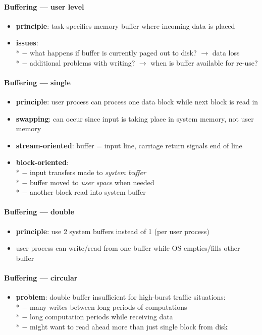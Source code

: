 \paragraph{Buffering --- user level}
\begin{itemize}
  \item \textbf{principle}: task specifies memory buffer where incoming data is placed
  \item \textbf{issues}: \\*
    $ - $ what happens if buffer is currently paged out to disk? $ \to $ data loss \\*
    $ - $ additional problems with writing? $ \to $ when is buffer available for re-use?
\end{itemize}

\paragraph{Buffering --- single}
\begin{itemize}
  \item \textbf{principle}: user process can process one data block while next block is read in
  \item \textbf{swapping}: can occur since input is taking place in system memory, not user memory
  \item \textbf{stream-oriented}: buffer = input line, carriage return signals end of line
  \item \textbf{block-oriented}: \\*
    $ - $ input transfers made to \emph{system buffer} \\*
    $ - $ buffer moved to \emph{user space} when needed \\*
    $ - $ another block read into system buffer
\end{itemize}

\paragraph{Buffering --- double}
\begin{itemize}
  \item \textbf{principle}: use 2 system buffers instead of 1 (per user process)
  \item user process can write/read from one buffer while OS empties/fills other buffer
\end{itemize}

\paragraph{Buffering --- circular}
\begin{itemize}
  \item \textbf{problem}: double buffer insufficient for high-burst traffic situations: \\*
    $ - $ many writes between long periods of computations \\*
    $ - $ long computation periods while receiving data \\*
    $ - $ might want to read ahead more than just single block from disk
\end{itemize}